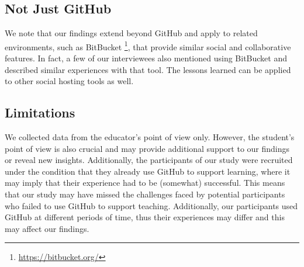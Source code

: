 \subsection{Not Just GitHub}
We note that our findings extend beyond GitHub and apply to related environments, such as BitBucket \footnote{\url{https://bitbucket.org/}}, that provide similar social and collaborative features. In fact, a few of our interviewees also mentioned using BitBucket and described similar experiences with that tool. The lessons learned can be applied to other social hosting tools as well.



\subsection{Limitations}
\label{sec:limitations}
We collected data from the educator's point of view only. However, the student's point of view is also crucial and may provide additional support to our findings or reveal new insights. Additionally, the participants of our study were recruited under the condition that they already use GitHub to support learning, where it may imply that their experience had to be (somewhat) successful. This means that our study may have missed the challenges faced by potential participants who failed to use GitHub to support teaching. Additionally, our participants used GitHub at different periods of time, thus their experiences may differ and this may affect our findings.

